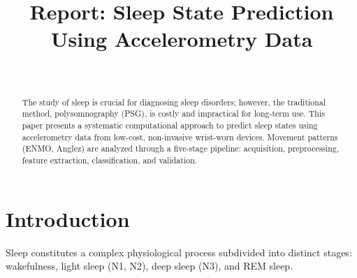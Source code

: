 \documentclass[conference]{IEEEtran}
\begin{document}
\title{Report: Sleep State Prediction Using Accelerometry Data}

\author{
	\\
	\and
}

\maketitle

\begin{abstract}
	The study of sleep is crucial for diagnosing sleep disorders; however, the traditional method, polysomnography (PSG), is costly and impractical for long-term use. This paper presents a systematic computational approach to predict sleep states using accelerometry data from low-cost, non-invasive wrist-worn devices. Movement patterns (ENMO, Anglez) are analyzed through a five-stage pipeline: acquisition, preprocessing, feature extraction, classification, and validation.
\end{abstract}

\section{Introduction}

Sleep constitutes a complex physiological process subdivided into distinct stages: wakefulness, light sleep (N1, N2), deep sleep (N3), and REM sleep.
\end{document}
